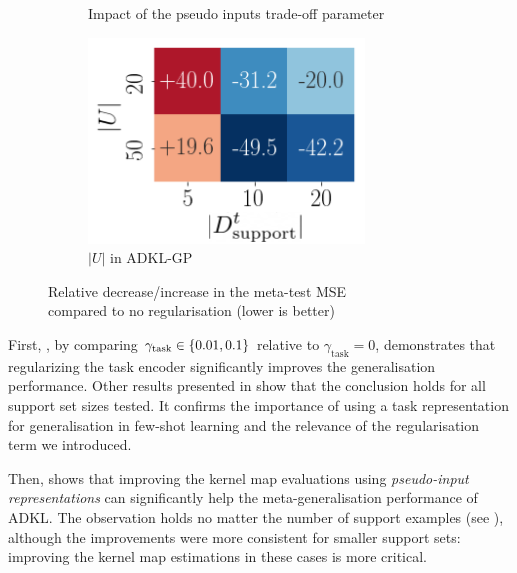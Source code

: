 \documentclass[11pt]{article}
\numberwithin{equation}{subsection}
\begin{document}
\begin{figure}[ht]
\begin{subfigure}[t]{0.72\textwidth}
        \caption{\small Impact of the pseudo inputs trade-off parameter}
        \label{fig:gamma-pseudo}
    \end{subfigure}
    \hfill
    \begin{subfigure}[t]{0.26\textwidth}
        \centering
        \includegraphics[width=\linewidth]{adkl/ablation/pseudo-gp}
        \caption{ $|U|$ in ADKL-GP}
        \label{fig:pseudo-gp}
    \end{subfigure}
    \caption{Relative decrease/increase in the meta-test MSE\\compared to no regularisation (lower is better)}
    \label{fig:ablation}
\end{figure}

First, , by comparing $\gamma_\mathrm{task} \in \left\{ 0.01, 0.1\right\} $ relative to $\gamma_\mathrm{task} = 0$,  demonstrates that regularizing the task encoder significantly improves the generalisation performance.
Other results presented in  show that the conclusion holds for all support set sizes tested. It confirms the importance of using a task representation for generalisation in few-shot learning and the relevance of the regularisation term we introduced.

Then,  shows that improving the kernel map evaluations using \textit{pseudo-input representations} can significantly help the meta-generalisation performance of ADKL. The observation holds no matter the number of support examples (see ), although the improvements were more consistent for smaller support sets: improving the kernel map estimations in these cases is more critical.
\end{document}
